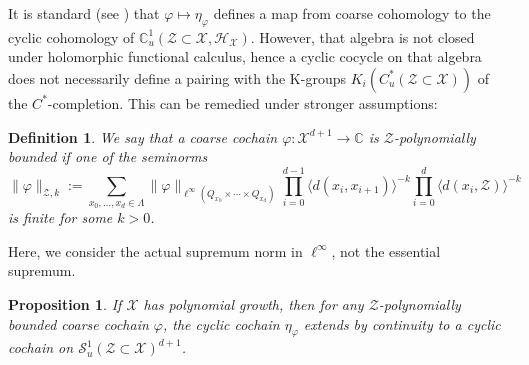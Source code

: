 \documentclass[12pt]{amsart}
\newtheorem{definition}[theorem]{Definition}
\newtheorem{proposition}[theorem]{Proposition}
\newcommand{\CM}{{\mathbb C}}
\newcommand{\Ss}{{\mathcal S}}
\newcommand{\Hh}{{\mathcal H}}
\newcommand{\Xx}{{\mathcal X}}
\newcommand{\Zz}{{\mathcal Z}}
\begin{document}
It is standard (see \cite{Roe1993}) that $\varphi\mapsto \eta_\varphi$ defines a map from coarse cohomology to the cyclic cohomology of $\CM_u^1(\Zz\subset\Xx,\Hh_\Xx)$. However, that algebra is not closed under holomorphic functional calculus, hence a cyclic cocycle on that algebra does not necessarily define a pairing with the K-groups $K_i(C^*_u(\Zz\subset \Xx))$ of the $C^*$-completion. This can be remedied under stronger assumptions:

\begin{definition}
We say that a coarse cochain $\varphi: \Xx^{d+1}\to \CM$ is $\Zz$-polynomially bounded if one of the seminorms
$$\|\varphi\|_{\Zz, k}:=\sum_{x_0,\dots,x_{d}\in \Lambda}  \|\varphi\|_{\ell^\infty(
Q_{x_0}\times\cdots\times Q_{x_d})} \prod_{i=0}^{d-1} \langle d(x_i, x_{i+1})\rangle^{-k}\prod_{i=0}^{d}  \langle d(x_i, \Zz)\rangle^{-k}$$
is finite for some $k>0$.
\end{definition}
Here, we consider the actual supremum norm in $\ell^{\infty}$, not the essential supremum.
\begin{proposition}
\label{prop:cont_ext}
If $\Xx$ has polynomial growth, then for any $\Zz$-polynomially bounded coarse cochain $\varphi$, the cyclic cochain $\eta_{\varphi}$ extends by continuity to a cyclic cochain on $\Ss_u^1(\Zz\subset \Xx)^{d+1}$.
\end{proposition}
\end{document}
